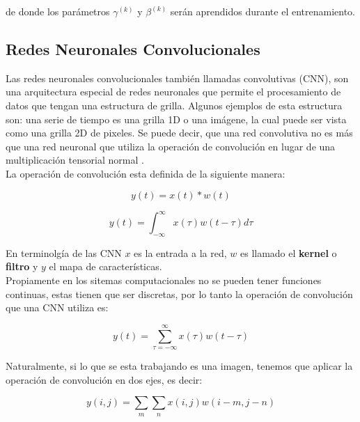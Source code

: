 	de donde los parámetros $\gamma^{(k)}$ y $\beta^{(k)}$ serán aprendidos durante el entrenamiento.

    \subsection{Redes Neuronales Convolucionales}
    
    Las redes neuronales convolucionales también llamadas convolutivas (CNN), son una arquitectura especial de redes neuronales que permite el procesamiento de datos que tengan una estructura de grilla. Algunos ejemplos de esta estructura son: una serie de tiempo es una grilla 1D o una imágene, la cual puede ser vista como una grilla 2D de pixeles. Se puede decir, que una red convolutiva no es más que una red neuronal que utiliza la operación de convolución en lugar de una multiplicación tensorial normal \cite{deeplearningbook}. \\
    
    La operación de convolución esta definida de la siguiente manera:
    
	\begin{equation}
		y(t) = x(t) * w(t)
	\end{equation}

    \begin{equation}
    	y(t) = \int_{-\infty}^{\infty} x(\tau)w(t-\tau)d\tau
    \end{equation}
    
    En terminolgía de las CNN $x$ es la entrada a la red, $w$ es llamado el \textbf{kernel} o \textbf{filtro} y $y$ el mapa de características. \\
    
    Propiamente en los sitemas computacionales no se pueden tener funciones continuas, estas tienen que ser discretas, por lo tanto la operación de convolución que una CNN utiliza es:
    
    \begin{equation}
    	y(t) = \sum_{\tau = -\infty}^{\infty} x(\tau)w(t-\tau)
    \end{equation}
    
    Naturalmente, si lo que se esta trabajando es una imagen, tenemos que aplicar la operación de convolución en dos ejes, es decir:
    
    \begin{equation}
    	y(i,j) = \sum_{m}\sum_{n} x(i,j)w(i-m, j-n)
    \end{equation}

